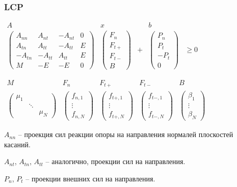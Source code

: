 \documentclass{beamer}
\begin{document}
\begin{frame}[t]
\frametitle{LCP}
    $
    \begin{matrix}
        A & x & & b \\
        \begin{pmatrix}
            A_{nn} & A_{nt} & -A_{nt} & 0 \\
            A_{tn} & A_{tt} & -A_{tt} & E \\
            -A_{tn} & -A_{tt} & A_{tt} & E \\
            M & -E & -E & 0
        \end{pmatrix} &
        \begin{pmatrix}
        F_{n} \\
        F_{t+} \\
        F_{t-}  \\
        B
        \end{pmatrix}
        & + &
        \begin{pmatrix}
        P_{n} \\
        P_{t} \\
        -P_{t}  \\
        0
        \end{pmatrix} & \ge 0
    \end{matrix} 
    $

    \medskip
    $
    \begin{matrix}
        M & F_n & F_{t+} & F_{t-} & B \\

        \begin{pmatrix} \mu_1 \\ & \ddots \\ & & \mu_N \end{pmatrix} &
        \begin{pmatrix} f_{n,1} \\ \vdots \\ f_{n,N} \end{pmatrix} &
        \begin{pmatrix} f_{t+,1} \\ \vdots \\ f_{t+,N} \end{pmatrix} &
        \begin{pmatrix} f_{t-,1} \\ \vdots \\ f_{t-,N} \end{pmatrix} &
        \begin{pmatrix} \beta_{1} \\ \vdots \\ \beta_N \end{pmatrix}
    \end{matrix}
    $

    \medskip
    $A_{nn}$ -- проекция сил реакции опоры на направления нормалей плоскостей касаний.

    $A_{nt}$, $A_{tn}$, $A_{tt}$ -- аналогично, проекции сил на направления.

    $P_{n}$, $P_{t}$ -- проекции внешних сил на направления.
\end{frame}
\end{document}
